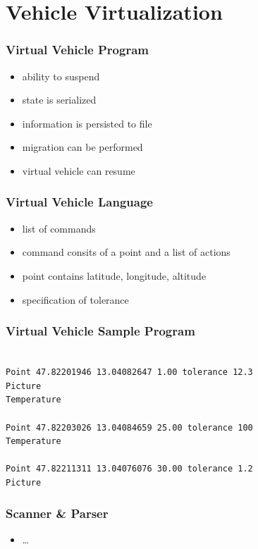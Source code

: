 \documentclass{beamer}
\begin{document}
\section{Vehicle Virtualization}

\begin{frame}\frametitle{Virtual Vehicle Program} %
\begin{itemize}
\item ability to suspend
\item state is serialized
\item information is persisted to file
\item migration can be performed
\item virtual vehicle can resume
\end{itemize} 
\end{frame}

\begin{frame}\frametitle{Virtual Vehicle Language} %
\begin{itemize}
\item list of commands
\item command consits of a point and a list of actions
\item point contains latitude, longitude, altitude
\item specification of tolerance
\end{itemize} 
\end{frame}

\begin{frame}\frametitle{Virtual Vehicle Sample Program} %
\texttt{\\
Point 47.82201946 13.04082647 1.00 tolerance 12.3\\
Picture \\
Temperature\\
\\
Point 47.82203026 13.04084659 25.00 tolerance 100 \\
Temperature\\
\\
Point 47.82211311 13.04076076 30.00 tolerance 1.2\\
Picture} 
\end{frame}

\begin{frame}\frametitle{Scanner \& Parser} %
\begin{itemize}
\item \ldots
\end{itemize} 
\end{frame}
\end{document}
